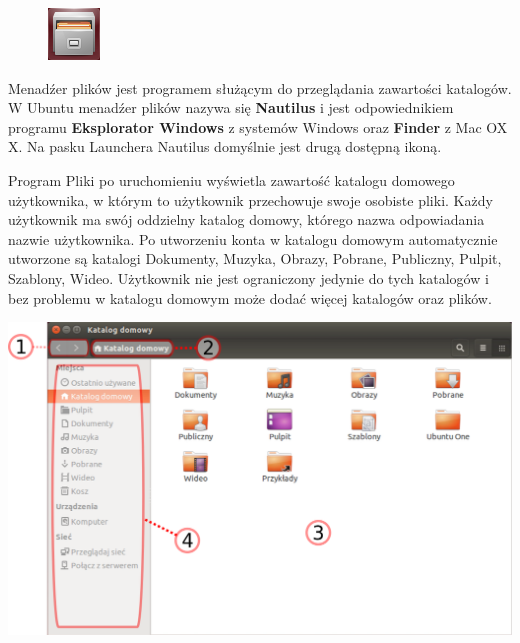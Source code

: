 \begin{figure}
                \includegraphics[width=\linewidth]{images/ikony_pliki.png}
\end{figure}

Menadźer plików jest programem służącym do przeglądania zawartości katalogów. W Ubuntu menadźer plików nazywa się \textbf{Nautilus} i jest odpowiednikiem programu \textbf{Eksplorator Windows} z systemów Windows oraz \textbf{Finder} z Mac OX X. Na pasku Launchera Nautilus domyślnie jest drugą dostępną ikoną. 

Program Pliki po uruchomieniu wyświetla zawartość katalogu domowego użytkownika, w którym to użytkownik przechowuje swoje osobiste pliki. Każdy użytkownik ma swój oddzielny katalog domowy, którego nazwa odpowiadania nazwie użytkownika. Po utworzeniu konta w katalogu domowym automatycznie utworzone są katalogi Dokumenty, Muzyka, Obrazy, Pobrane, Publiczny, Pulpit, Szablony, Wideo. Użytkownik nie jest ograniczony jedynie do tych katalogów i bez problemu w katalogu domowym może dodać więcej katalogów oraz plików.
\clearpage
\begin{center}
	\includegraphics[scale=0.5]{images/programy_nautilus.png}
\end{center}

